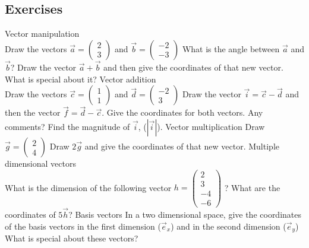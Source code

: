 \documentclass[a4paper]{report}
\begin{document}
\subsection{Exercises}
\begin{Exercise}[title= Answer the following questions,label=exVEC,difficulty=1]
\Question Vector manipulation\\ 
\subQuestion Draw the vectors $\vec{a} = \begin{pmatrix}
2 \\
3 
\end{pmatrix}$ and $\vec{b} = \begin{pmatrix}
-2 \\
-3 
\end{pmatrix}$
\subQuestion What is the angle between $\vec{a}$ and $\vec{b}$?
\subQuestion Draw the vector $\vec{a}+\vec{b}$ and then give the coordinates of that new vector. What is special about it?
\Question Vector addition\\
\subQuestion Draw the vectors $\vec{c} = \begin{pmatrix}
1 \\
1 
\end{pmatrix}$ and $\vec{d} = \begin{pmatrix}
-2 \\
3 
\end{pmatrix}$
\subQuestion Draw the vector $\vec{i}=\vec{c}-\vec{d}$ and then the vector $\vec{f}=\vec{d}-\vec{c}$. Give the coordinates for both vectors. Any comments?
\subQuestion Find the magnitude of $\vec{i}$, ($|\vec{i}|$).
\Question Vector multiplication
\subQuestion Draw $\vec{g} = \begin{pmatrix}
2 \\
4 
\end{pmatrix}$ 
\subQuestion Draw $2\vec{g}$ and give the coordinates of that new vector.
\Question Multiple dimensional vectors\\
\subQuestion What is the dimension of the following vector $h = \begin{pmatrix}
2 \\
3 \\
-4\\
-6
\end{pmatrix}$ ?
\subQuestion What are the coordinates of $5\vec{h}$?
\Question Basis vectors
\subQuestion In a two dimensional space, give the coordinates of the basis vectors in the first dimension ($\vec{e}_x$) and in the second dimension ($\vec{e}_y$)
\subQuestion What is special about these vectors?
\end{Exercise}
\end{document}
